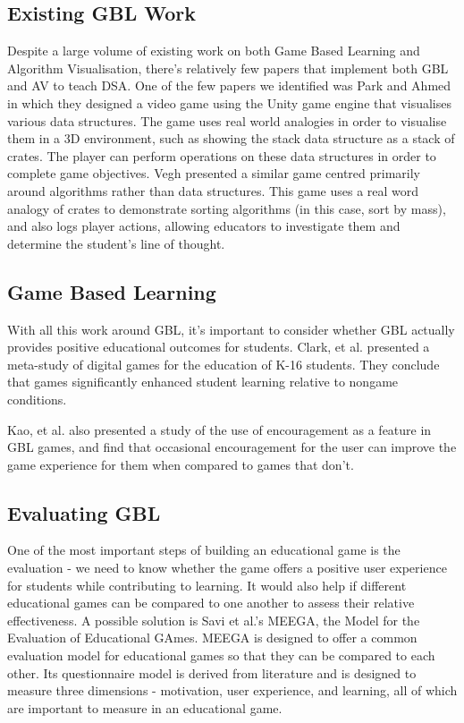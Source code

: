 \documentclass[11pt]{article}
\begin{document}
\subsection{Existing GBL Work}
Despite a large volume of existing work on both Game Based Learning and Algorithm Visualisation, there's relatively few papers that implement both GBL and AV to teach DSA. One of the few papers we identified was Park and Ahmed\cite{Park} in which they designed a video game using the Unity game engine that visualises various data structures. The game uses real world analogies in order to visualise them in a 3D environment, such as showing the stack data structure as a stack of crates. The player can perform operations on these data structures in order to complete game objectives. Vegh\cite{vegh} presented a similar game centred primarily around algorithms rather than data structures. This game uses a real word analogy of crates to demonstrate sorting algorithms (in this case, sort by mass), and also logs player actions, allowing educators to investigate them and determine the student's line of thought.
\subsection{Game Based Learning}
With all this work around GBL, it's important to consider whether GBL actually provides positive educational outcomes for students. Clark, et al. presented a meta-study of digital games for the education of K-16 students\cite{doi:10.3102/0034654315582065}. They conclude that games significantly enhanced student learning relative to nongame conditions.\par
Kao, et al. also presented a study of the use of encouragement as a feature in GBL games, and find that occasional encouragement for the user can improve the game experience for them when compared to games that don't\cite{Kao:2016:EEE:2851581.2892335}.
\subsection{Evaluating GBL}
\label{meegalitrev}
One of the most important steps of building an educational game is the evaluation - we need to know whether the game offers a positive user experience for students while contributing to learning. It would also help if different educational games can be compared to one another to assess their relative effectiveness. A possible solution is Savi et al.'s MEEGA\cite{Rafael}\cite{meegaPlus}, the Model for the Evaluation of Educational GAmes. MEEGA is designed to offer a common evaluation model for educational games so that they can be compared to each other. Its questionnaire model is derived from literature and is designed to measure three dimensions - motivation, user experience, and learning, all of which are important to measure in an educational game.
\end{document}
